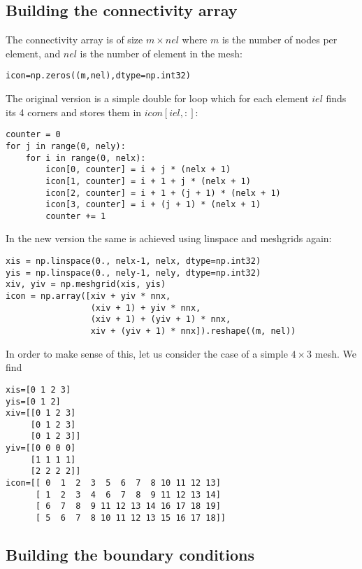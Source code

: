 \subsection*{Building the connectivity array}

The connectivity array is of size $m \times nel$ 
where $m$ is the number of nodes per element, and $nel$ is the number 
of element in the mesh: 

\begin{lstlisting}
icon=np.zeros((m,nel),dtype=np.int32)
\end{lstlisting}

The original version is a simple double for loop
which for each element $iel$ finds its 4 corners and 
stores them in $icon[iel,:]$:

\begin{lstlisting}
counter = 0
for j in range(0, nely):
    for i in range(0, nelx):
        icon[0, counter] = i + j * (nelx + 1)
        icon[1, counter] = i + 1 + j * (nelx + 1)
        icon[2, counter] = i + 1 + (j + 1) * (nelx + 1)
        icon[3, counter] = i + (j + 1) * (nelx + 1)
        counter += 1
\end{lstlisting}

In the new version the same is achieved
using linspace and meshgrids again:

\begin{lstlisting}
xis = np.linspace(0., nelx-1, nelx, dtype=np.int32)
yis = np.linspace(0., nely-1, nely, dtype=np.int32)
xiv, yiv = np.meshgrid(xis, yis)
icon = np.array([xiv + yiv * nnx,
                 (xiv + 1) + yiv * nnx,
                 (xiv + 1) + (yiv + 1) * nnx,
                 xiv + (yiv + 1) * nnx]).reshape((m, nel))
\end{lstlisting}

In order to make sense of this, let us consider the 
case of a simple $4\times 3$ mesh. 
We find 
\begin{verbatim}
xis=[0 1 2 3]
yis=[0 1 2]
xiv=[[0 1 2 3]
     [0 1 2 3]
     [0 1 2 3]]
yiv=[[0 0 0 0]
     [1 1 1 1]
     [2 2 2 2]]
icon=[[ 0  1  2  3  5  6  7  8 10 11 12 13]
      [ 1  2  3  4  6  7  8  9 11 12 13 14]
      [ 6  7  8  9 11 12 13 14 16 17 18 19]
      [ 5  6  7  8 10 11 12 13 15 16 17 18]]
\end{verbatim}

\subsection*{Building the boundary conditions} 



